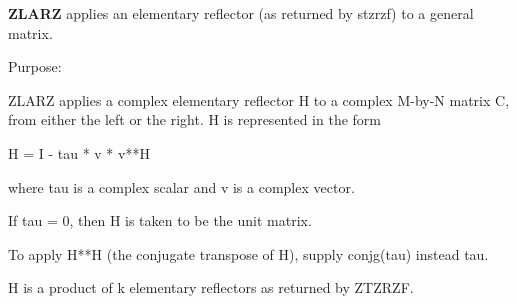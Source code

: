 {\bfseries Z\+L\+A\+R\+Z} applies an elementary reflector (as returned by stzrzf) to a general matrix. 

 \begin{DoxyParagraph}{Purpose\+: }
\begin{DoxyVerb} ZLARZ applies a complex elementary reflector H to a complex
 M-by-N matrix C, from either the left or the right. H is represented
 in the form

       H = I - tau * v * v**H

 where tau is a complex scalar and v is a complex vector.

 If tau = 0, then H is taken to be the unit matrix.

 To apply H**H (the conjugate transpose of H), supply conjg(tau) instead
 tau.

 H is a product of k elementary reflectors as returned by ZTZRZF.\end{DoxyVerb}
 
\end{DoxyParagraph}

